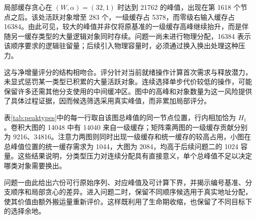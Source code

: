 局部缓存贪心在 $(W,\alpha)=(32,1)$ 时达到 21762 的峰值，出现在第 1618 个节点之后。该处活跃对象增至 283 个，一级缓存占 5378，而零级右输入缓存占 16384。由此可见，较大的峰值并非仅将原基准的一级缓存高峰继续抬升，而是伴随另一缓存类型的大量逻辑对象同时存续。问题一尚未进行物理分配，16384 表示该顺序要求的逻辑驻留量；后续引入物理容量时，必须通过换入换出处理这种压力。

这与净增量评分的结构相吻合。评分针对当前就绪操作计算首次需求与释放潜力，未显式惩罚某一类型已积累的大量活跃对象。连续选择单步代价较低的操作，可能保留许多还需其他分支使用的中间缓冲区。图中的高峰和对象数量为这一风险提供了具体过程证据，因而候选筛选采用真实峰值，而非累加局部评分。

\begin{table}[H]\centering{}
\caption{各选定序列总峰值发生位置的分类型组成}\label{tab:peaktypes}
\end{table}
表\ref{tab:peaktypes}中的每一行取自该图总峰值的同一节点位置，行内相加恰为 $H_1$。卷积大图的 14048 中有 14040 来自一级缓存；矩阵乘两图的一级缓存贡献分别为 9216、34816。注意力两图则同时出现一级缓存和统一缓存的较高占用，小图在总峰值位置的统一缓存需求为 1044，大图为 2084，均高于后续问题二的 1024 容量。这些结果说明，分类型压力对连续分配具有直接意义，单个总峰值不足以决定哪类对象需要换出。

问题一由此给出六份可行原始序列、对应峰值及可计算下界，并揭示编号基准、分支顺序和局部贪心的差异。进入问题二时，保留不同顺序候选用于真实地址分配，使其价值由额外搬运量重新评价。这样既利用了生命期收缩，也保留了不同目标下的选择余地。
